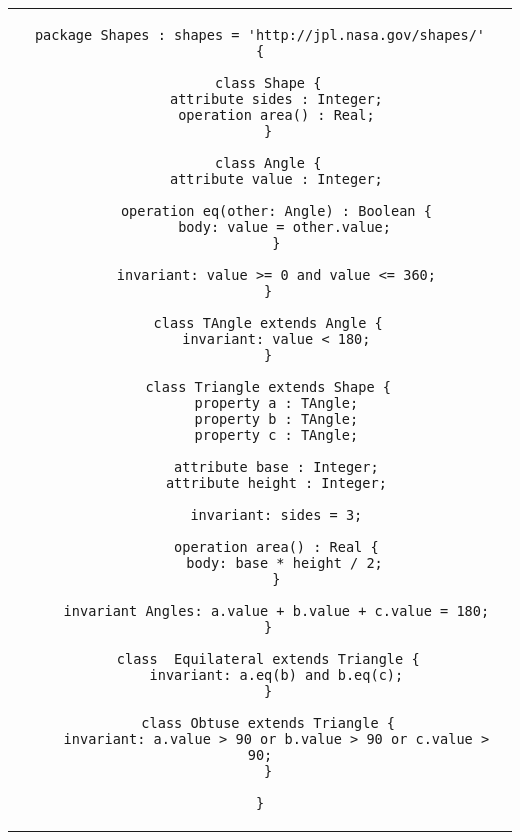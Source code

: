 \begin{center}
\begin{tabular}{c}
\small
\begin{lstlisting}
package Shapes : shapes = 'http://jpl.nasa.gov/shapes/'
{

  class Shape {
    attribute sides : Integer;
    operation area() : Real;
  }

  class Angle {
    attribute value : Integer;
    
    operation eq(other: Angle) : Boolean {
      body: value = other.value;
    }

    invariant: value >= 0 and value <= 360;
  }

  class TAngle extends Angle {
    invariant: value < 180;
  }

  class Triangle extends Shape {
    property a : TAngle;
    property b : TAngle;
    property c : TAngle;

    attribute base : Integer;
    attribute height : Integer;
 
    invariant: sides = 3;

    operation area() : Real {
      body: base * height / 2;
    }
 
    invariant Angles: a.value + b.value + c.value = 180;
  }

  class  Equilateral extends Triangle {
    invariant: a.eq(b) and b.eq(c);
  }

  class Obtuse extends Triangle {
    invariant: a.value > 90 or b.value > 90 or c.value > 90;
  }

}
\end{lstlisting}
\end{tabular}
\end{center}